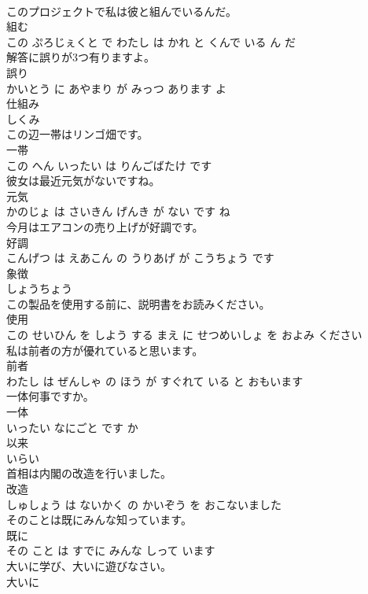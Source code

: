 \documentclass[8pt]{extreport}
\begin{document}
\begin{CJK}{UTF8}{min}
\\	このプロジェクトで私は彼と組んでいるんだ。	
\\	組む 
\\	この ぷろじぇくと で わたし は かれ と くんで いる ん だ		
\\	解答に誤りが3つ有りますよ。	
\\	誤り 
\\	かいとう に あやまり が みっつ あります よ		
\\	仕組み	
\\	しくみ		
\\	この辺一帯はリンゴ畑です。	
\\	一帯 
\\	この へん いったい は りんごばたけ です		
\\	彼女は最近元気がないですね。	
\\	元気 
\\	かのじょ は さいきん げんき が ない です ね		
\\	今月はエアコンの売り上げが好調です。	
\\	好調 
\\	こんげつ は えあこん の うりあげ が こうちょう です		
\\	象徴	
\\	しょうちょう		
\\	この製品を使用する前に、説明書をお読みください。	
\\	使用 
\\	この せいひん を しよう する まえ に せつめいしょ を およみ ください		
\\	私は前者の方が優れていると思います。	
\\	前者 
\\	わたし は ぜんしゃ の ほう が すぐれて いる と おもいます		
\\	一体何事ですか。	
\\	一体 
\\	いったい なにごと です か		
\\	以来	
\\	いらい		
\\	首相は内閣の改造を行いました。	
\\	改造 
\\	しゅしょう は ないかく の かいぞう を おこないました		
\\	そのことは既にみんな知っています。	
\\	既に 
\\	その こと は すでに みんな しって います		
\\	大いに学び、大いに遊びなさい。	
\\	大いに 

\end{CJK}
\end{document}
